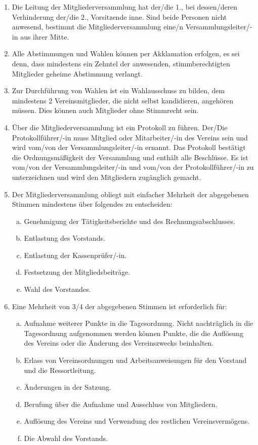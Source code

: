 \documentclass{article}
\begin{document}
\begin{enumerate}[§ 1.]
\begin{enumerate}[1.]
	\item Die Leitung der Mitgliederversammlung hat der/die 1., bei dessen/deren Verhinderung der/die 2., Vorsitzende inne. Sind beide Personen nicht anwesend, bestimmt die Mitgliederversammlung eine/n Versammlungsleiter/-in aus ihrer Mitte.
	\item Alle Abstimmungen und Wahlen können per Akklamation erfolgen, es sei denn, dass mindestens ein Zehntel der anwesenden, stimmberechtigten Mitglieder geheime Abstimmung verlangt.
	\item Zur Durchführung von Wahlen ist ein Wahlausschuss zu bilden, dem mindestens 2 Vereinsmitglieder, die nicht selbst kandidieren, angehören müssen. Dies können auch Mitglieder ohne Stimmrecht sein.
	\item Über die Mitgliederversammlung ist ein Protokoll zu führen. Der/Die Protokollführer/-in muss Mitglied oder Mitarbeiter/-in des Vereins sein und wird vom/von der Versammlungsleiter/-in ernannt. Das Protokoll bestätigt die Ordnungsmäßigkeit der Versammlung und enthält alle Beschlüsse. Es ist vom/von der Versammlungsleiter/-in und vom/von der Protokollführer/-in zu unterzeichnen und wird den Mitgliedern zugänglich gemacht.
	\item Der Mitgliederversammlung obliegt mit einfacher Mehrheit der abgegebenen Stimmen mindestens über folgendes zu entscheiden:
		\begin{enumerate}[a.]
		\item Genehmigung der Tätigkeitsberichte und des Rechnungsabschlusses.
		\item Entlastung des Vorstands.
		\item Entlastung der Kassenprüfer/-in.
		\item Festsetzung der Mitgliedsbeiträge.
		\item Wahl des Vorstandes.
		\end{enumerate}
	\item Eine Mehrheit von 3/4 der abgegebenen Stimmen ist erforderlich für:
		\begin{enumerate}[a.]
		\item Aufnahme weiterer Punkte in die Tagesordnung. Nicht nachträglich in die Tagesordnung aufgenommen werden können Punkte, die die Auflösung des Vereins oder die Änderung des Vereinszwecks beinhalten.
		\item Erlass von Vereinsordnungen und Arbeitsanweisungen für den Vorstand und die Ressortleitung.
		\item Änderungen in der Satzung.
		\item Berufung über die Aufnahme und Ausschluss von Mitgliedern.
		\item Auflösung des Vereins und Verwendung des restlichen
Vereinsvermögens.
		\item Die Abwahl des Vorstands.
		\end{enumerate}
	\end{enumerate}


\end{enumerate}
\end{document}

